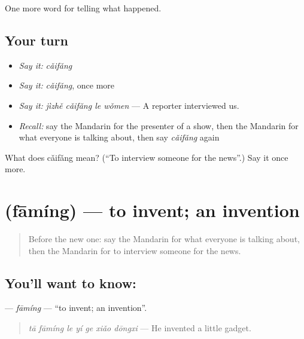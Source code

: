\begin{grammarlens}[title={What you've built}]
One more word for telling what happened.
\end{grammarlens}

\subsection*{Your turn}
\begin{itemize}
\raggedright
  \item \emph{Say it:} \emph{cǎifǎng}
  \item \emph{Say it:} \emph{cǎifǎng}, once more
  \item \emph{Say it:} \emph{jìzhě cǎifǎng le wǒmen} — A reporter interviewed us.
  \item \emph{Recall:} say the Mandarin for the presenter of a show, then the Mandarin for what everyone is talking about, then say \emph{cǎifǎng} again
\end{itemize}

\begin{tcolorbox}[breakable,colback=teal!4,colframe=teal!35!black,title={Before you move on}]
What does cǎifǎng mean? (\textquotedblleft{}To interview someone for the news\textquotedblright{}.) Say it once more.
\end{tcolorbox}
\section[\texorpdfstring{\zh{发明} (fāmíng)}{发明 (fāmíng)}]{ (fāmíng) — to invent; an invention}

\label{lesson:ZH-C291-faming}



\begin{quote}
Before the new one: say the Mandarin for what everyone is talking about, then the Mandarin for to interview someone for the news.
\end{quote}

\subsection*{You'll want to know: }
\textbf{} — \emph{fāmíng} — \textquotedblleft{}to invent; an invention\textquotedblright{}.

\begin{quote}
\textbf{} \emph{tā fāmíng le yí ge xiǎo dōngxi} — He invented a little gadget.
\end{quote}

